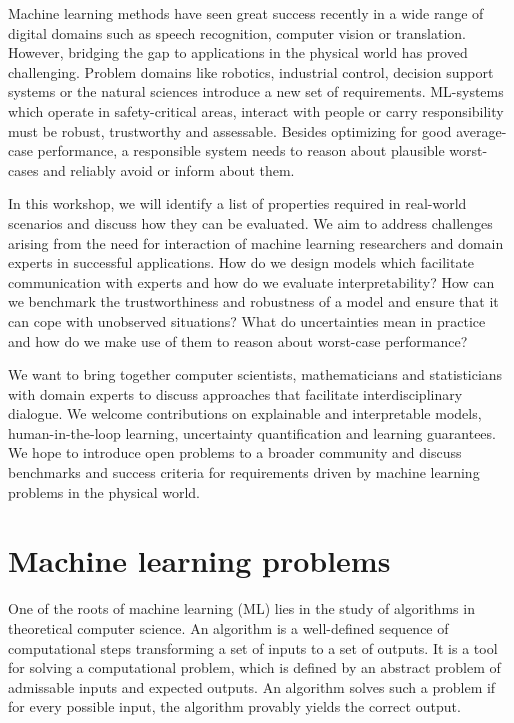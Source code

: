 Machine learning methods have seen great success recently in a wide range of digital domains such as speech recognition, computer vision or translation.
However, bridging the gap to applications in the physical world has proved challenging.
Problem domains like robotics, industrial control, decision support systems or the natural sciences introduce a new set of requirements.
ML-systems which operate in safety-critical areas, interact with people or carry responsibility must be robust, trustworthy and assessable.
Besides optimizing for good average-case performance, a responsible system needs to reason about plausible worst-cases and reliably avoid or inform about them.

In this workshop, we will identify a list of properties required in real-world scenarios and discuss how they can be evaluated.
We aim to address challenges arising from the need for interaction of machine learning researchers and domain experts in successful applications.
How do we design models which facilitate communication with experts and how do we evaluate interpretability?
How can we benchmark the trustworthiness and robustness of a model and ensure that it can cope with unobserved situations?
What do uncertainties mean in practice and how do we make use of them to reason about worst-case performance?

We want to bring together computer scientists, mathematicians and statisticians with domain experts to discuss approaches that facilitate interdisciplinary dialogue.
We welcome contributions on explainable and interpretable models, human-in-the-loop learning, uncertainty quantification and learning guarantees.
We hope to introduce open problems to a broader community and discuss benchmarks and success criteria for requirements driven by machine learning problems in the physical world.

\section{Machine learning problems}
\label{toc:bayesian_ml:ml_problems}
One of the roots of machine learning (ML) lies in the study of algorithms in theoretical computer science.
An algorithm is a well-defined sequence of computational steps transforming a set of inputs to a set of outputs.
It is a tool for solving a computational problem, which is defined by an abstract problem of admissable inputs and expected outputs.
An algorithm solves such a problem if for every possible input, the algorithm provably yields the correct output.

